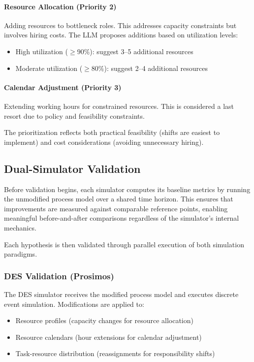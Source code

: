 \documentclass[preprint,12pt]{elsarticle}
\begin{document}
\paragraph{Resource Allocation (Priority 2)}
Adding resources to bottleneck roles. This addresses capacity constraints but involves hiring costs. The LLM proposes additions based on utilization levels:
\begin{itemize}
    \item High utilization ($\geq 90\%$): suggest 3--5 additional resources
    \item Moderate utilization ($\geq 80\%$): suggest 2--4 additional resources
\end{itemize}

\paragraph{Calendar Adjustment (Priority 3)}
Extending working hours for constrained resources. This is considered a last resort due to policy and feasibility constraints.

The prioritization reflects both practical feasibility (shifts are easiest to implement) and cost considerations (avoiding unnecessary hiring).

\subsection{Dual-Simulator Validation}

Before validation begins, each simulator computes its baseline metrics by running the unmodified process model over a shared time horizon. This ensures that improvements are measured against comparable reference points, enabling meaningful before-and-after comparisons regardless of the simulator's internal mechanics.

Each hypothesis is then validated through parallel execution of both simulation paradigms.

\subsubsection{DES Validation (Prosimos)}

The DES simulator receives the modified process model and executes discrete event simulation. Modifications are applied to:
\begin{itemize}
    \item Resource profiles (capacity changes for resource allocation)
    \item Resource calendars (hour extensions for calendar adjustment)
    \item Task-resource distribution (reassignments for responsibility shifts)
\end{itemize}
\end{document}
